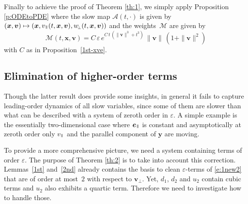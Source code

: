 \documentclass[JEP,XML,SOM,Unicode]{cedram}
\let\mathcal\mathscr
\newcommand\mto{\mathchoice{\longmapsto}{\mapsto}{\mapsto}{\mapsto}}
\newcommand{\sperp}{{\scriptscriptstyle\perp}}
\let\eps\varepsilon
\theoremstyle{plain}
\theoremstyle{definition}
\newcommand\bfv{{\boldsymbol v}}
\newcommand\bfx{{\boldsymbol x}}
\newcommand\bfy{{\boldsymbol y}}
\newcommand\cA{{\mathcal A}}
\newcommand\cM{{\mathcal M}}
\DeclareMathOperator{\beD}{\boldsymbol{e}}
\newcommand\eDpar{\beD_\mypar}
\newcommand\vpar{v_\mypar}
\newcommand\bvperp{\bfv_{\!\sperp}}
\newcommand\eperp{w_{\!\sperp}}
\newcommand{\mypar}{{\mkern3mu\vphantom{\perp}\vrule depth 0pt\mkern2mu\vrule depth 0pt\mkern3mu}}
\begin{document}
Finally to achieve the proof of Theorem \ref{th:1}, we simply apply
Proposition \ref{p:ODEtoPDE} where the slow map $\cA(t,\cdot)$ is
given by $(\bfx,\bfv)\mto (\bfx, \vpar(t,\bfx,\bfv),\eperp(t,\bfx,\bfv))$ and the weights~$\cM$ are given by
\[
\cM(t,\bfx,\bfv)= C\,\eps\,e^{C\,t\,(\|\bfv\|^3+t^3)}
\,\|\bfv\|\,(1+\|\bfv\|^2)
\]
with $C$ as in Proposition~\ref{1st-xve}.

\subsection{Elimination of higher-order terms}
Though the latter result does provide some insights, in general it
fails to capture leading-order dynamics of all slow variables, since
some of them are slower than what can be described with a system of
zeroth order in $\eps$. A simple example is the essentially
two-dimensional case where $\eDpar$ is constant and asymptotically at
zeroth order only $\vpar$ and the parallel component of $\bfy$ are
moving.

To provide a more comprehensive picture, we need a system containing
terms of order $\eps$. The purpose of Theorem
\ref{th:2} is to take into account this correction. Lemmas~\ref{1st} and~\ref{2nd} already contains the basis to clean $\eps$-terms of \eqref{e:1new2} that are of order at most~$2$ with respect to $\bvperp$. Yet, $d_1$, $d_2$ and $u_2$ contain cubic terms and $u_2$ also exhibits a quartic term. Therefore we need to investigate how to handle those.
\end{document}
